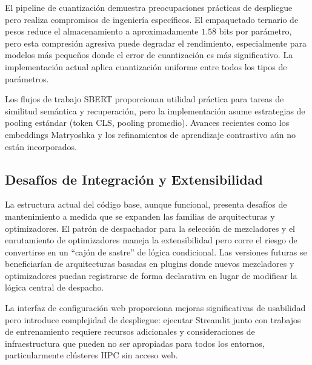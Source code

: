 El pipeline de cuantización demuestra preocupaciones prácticas de despliegue pero realiza compromisos de ingeniería específicos. El empaquetado ternario de pesos reduce el almacenamiento a aproximadamente $1.58$ bits por parámetro, pero esta compresión agresiva puede degradar el rendimiento, especialmente para modelos más pequeños donde el error de cuantización es más significativo. La implementación actual aplica cuantización uniforme entre todos los tipos de parámetros.

Los flujos de trabajo SBERT proporcionan utilidad práctica para tareas de similitud semántica y recuperación, pero la implementación asume estrategias de pooling estándar (token CLS, pooling promedio). Avances recientes como los embeddings Matryoshka \citep{muennighoff_matryoshka_2021} y los refinamientos de aprendizaje contrastivo \citep{chen_supervised_2020} aún no están incorporados.

\subsection{Desafíos de Integración y Extensibilidad}

La estructura actual del código base, aunque funcional, presenta desafíos de mantenimiento a medida que se expanden las familias de arquitecturas y optimizadores. El patrón de despachador para la selección de mezcladores y el enrutamiento de optimizadores maneja la extensibilidad pero corre el riesgo de convertirse en un ``cajón de sastre'' de lógica condicional. Las versiones futuras se beneficiarían de arquitecturas basadas en plugins donde nuevos mezcladores y optimizadores puedan registrarse de forma declarativa en lugar de modificar la lógica central de despacho.

La interfaz de configuración web proporciona mejoras significativas de usabilidad pero introduce complejidad de despliegue: ejecutar Streamlit junto con trabajos de entrenamiento requiere recursos adicionales y consideraciones de infraestructura que pueden no ser apropiadas para todos los entornos, particularmente clústeres HPC sin acceso web.

